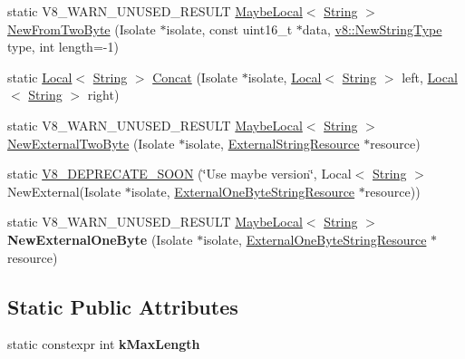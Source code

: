 \begin{DoxyCompactItemize}
\item 
static V8\+\_\+\+W\+A\+R\+N\+\_\+\+U\+N\+U\+S\+E\+D\+\_\+\+R\+E\+S\+U\+LT \mbox{\hyperlink{classv8_1_1MaybeLocal}{Maybe\+Local}}$<$ \mbox{\hyperlink{classv8_1_1String}{String}} $>$ \mbox{\hyperlink{classv8_1_1String_aaad4c7c856c29d79db85994c301fe601}{New\+From\+Two\+Byte}} (Isolate $\ast$isolate, const uint16\+\_\+t $\ast$data, \mbox{\hyperlink{namespacev8_ac9163ab12fb3b2a95907a3a0367c6095}{v8\+::\+New\+String\+Type}} type, int length=-\/1)
\item 
static \mbox{\hyperlink{classv8_1_1Local}{Local}}$<$ \mbox{\hyperlink{classv8_1_1String}{String}} $>$ \mbox{\hyperlink{classv8_1_1String_a757cf6ba6e17164fc962c1051c068c58}{Concat}} (Isolate $\ast$isolate, \mbox{\hyperlink{classv8_1_1Local}{Local}}$<$ \mbox{\hyperlink{classv8_1_1String}{String}} $>$ left, \mbox{\hyperlink{classv8_1_1Local}{Local}}$<$ \mbox{\hyperlink{classv8_1_1String}{String}} $>$ right)
\item 
static V8\+\_\+\+W\+A\+R\+N\+\_\+\+U\+N\+U\+S\+E\+D\+\_\+\+R\+E\+S\+U\+LT \mbox{\hyperlink{classv8_1_1MaybeLocal}{Maybe\+Local}}$<$ \mbox{\hyperlink{classv8_1_1String}{String}} $>$ \mbox{\hyperlink{classv8_1_1String_ad0491e4a3506df9ef9bfc08fca0d7a34}{New\+External\+Two\+Byte}} (Isolate $\ast$isolate, \mbox{\hyperlink{classv8_1_1String_1_1ExternalStringResource}{External\+String\+Resource}} $\ast$resource)
\item 
static \mbox{\hyperlink{classv8_1_1String_ad7186b5cfdddffbee8235a7216f31a67}{V8\+\_\+\+D\+E\+P\+R\+E\+C\+A\+T\+E\+\_\+\+S\+O\+ON}} (\char`\"{}Use maybe version\char`\"{}, Local$<$ \mbox{\hyperlink{classv8_1_1String}{String}} $>$ New\+External(Isolate $\ast$isolate, \mbox{\hyperlink{classv8_1_1String_1_1ExternalOneByteStringResource}{External\+One\+Byte\+String\+Resource}} $\ast$resource))
\item 
\mbox{\label{classv8_1_1String_a43edc2bcb1bf2a06f306ea9554042f24}} 
static V8\+\_\+\+W\+A\+R\+N\+\_\+\+U\+N\+U\+S\+E\+D\+\_\+\+R\+E\+S\+U\+LT \mbox{\hyperlink{classv8_1_1MaybeLocal}{Maybe\+Local}}$<$ \mbox{\hyperlink{classv8_1_1String}{String}} $>$ {\bfseries New\+External\+One\+Byte} (Isolate $\ast$isolate, \mbox{\hyperlink{classv8_1_1String_1_1ExternalOneByteStringResource}{External\+One\+Byte\+String\+Resource}} $\ast$resource)
\end{DoxyCompactItemize}
\subsection*{Static Public Attributes}
\begin{DoxyCompactItemize}
\item 
static constexpr int {\bfseries k\+Max\+Length}
\end{DoxyCompactItemize}


